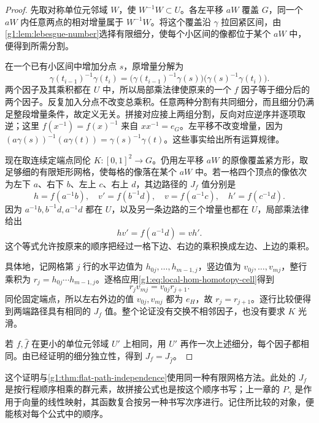 \begin{proof}
	先取对称单位元邻域 \(W\)，使 \(W^{-1}W\subset U\)。各左平移 \(aW\) 覆盖 \(G\)，同一个 \(aW\) 内任意两点的相对增量属于 \(W^{-1}W\)。将这个覆盖沿 \(\gamma\) 拉回紧区间，由\cref{g1:lem:lebesgue-number}选择有限细分，使每个小区间的像都位于某个 \(aW\) 中，便得到所需分割。

	在一个已有小区间中增加分点 \(s\)，原增量分解为
	\[
		\gamma(t_{i-1})^{-1}\gamma(t_i)
		=\bigl(\gamma(t_{i-1})^{-1}\gamma(s)\bigr)
		\bigl(\gamma(s)^{-1}\gamma(t_i)\bigr).
	\]
	两个因子及其乘积都在 \(U\) 中，所以局部乘法律使原来的一个 \(f\) 因子等于细分后的两个因子。反复加入分点不改变总乘积。任意两种分割有共同细分，而且细分仍满足整段增量条件，故定义无关。拼接对应接上两组分割，反向对应逆序并逐项取逆；这里 \(f(x^{-1})=f(x)^{-1}\) 来自 \(xx^{-1}=e_G\)。左平移不改变增量，因为 \((a\gamma(s))^{-1}(a\gamma(t))=\gamma(s)^{-1}\gamma(t)\)。这些事实给出所有运算规律。

	现在取连续定端点同伦 \(K:[0,1]^2\to G\)。仍用左平移 \(aW\) 的原像覆盖紧方形，取足够细的有限矩形网格，使每格的像落在某个 \(aW\) 中。若一格四个顶点的像依次为左下 \(a\)、右下 \(b\)、左上 \(c\)、右上 \(d\)，其边路径的 \(J_f\) 值分别是
	\[
		h=f(a^{-1}b),\quad v'=f(b^{-1}d),\quad
		v=f(a^{-1}c),\quad h'=f(c^{-1}d).
	\]
	因为 \(a^{-1}b,b^{-1}d,a^{-1}d\) 都在 \(U\)，以及另一条边路的三个增量也都在 \(U\)，局部乘法律给出
	\begin{equation}
		\label{g1:eq:local-hom-homotopy-cell}
		hv'=f(a^{-1}d)=vh'.
	\end{equation}
	这个等式允许按原来的顺序把经过一格下边、右边的乘积换成左边、上边的乘积。

	具体地，记网格第 \(j\) 行的水平边值为 \(h_{0j},\ldots,h_{m-1,j}\)，竖边值为 \(v_{0j},\ldots,v_{mj}\)，整行乘积为 \(r_j=h_{0j}\cdots h_{m-1,j}\)。逐格应用\eqref{g1:eq:local-hom-homotopy-cell}得到
	\[
		r_jv_{mj}=v_{0j}r_{j+1}.
	\]
	同伦固定端点，所以左右外边的值 \(v_{0j},v_{mj}\) 都为 \(e_H\)，故 \(r_j=r_{j+1}\)。逐行比较便得到两端路径具有相同的 \(J_f\) 值。整个论证没有交换不相邻因子，也没有要求 \(K\) 光滑。

	若 \(f,\widehat f\) 在更小的单位元邻域 \(U'\) 上相同，用 \(U'\) 再作一次上述细分，每个因子都相同。由已经证明的细分独立性，得到 \(J_f=J_{\widehat f}\)。
\end{proof}

这个证明与\cref{g1:thm:flat-path-independence}使用同一种有限网格方法。此处的 \(J_f\) 是按行程顺序相乘的群元素，故拼接公式也是按这个顺序书写；上一章的 \(P_\gamma\) 是作用于向量的线性映射，其函数复合按另一种书写次序进行。记住所比较的对象，便能核对每个公式中的顺序。

